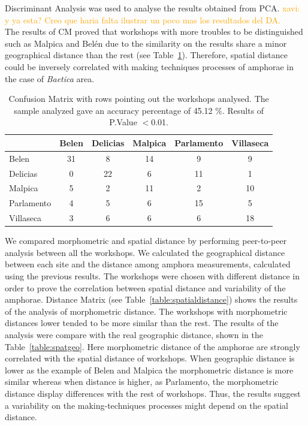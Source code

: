 \documentclass[review]{elsarticle}
\newcommand{\memo}[2]{\textcolor{#1}{#2}}
\newcommand{\xavi}[1]{\memo{orange}{xavi: #1\\}}
\begin{document}
Discriminant Analysis was used to analyse the results obtained from PCA. \xavi{y ya esta? Creo que haria falta ilustrar un poco mas los resultados del DA.} The results of CM proved that workshops with more troubles to be distinguished such as Malpica and Bel\'en due to the similarity on the results share a minor geographical distance than the rest (see Table~\ref{table:confusion}). Therefore, spatial distance could be inversely correlated with making techniques processes of amphorae in the case of \textit{Baetica} area. 


\begin{table}[htp]
\begin{tabular}{lccccc}
\hline
 & Belen & Delicias & Malpica & Parlamento & Villaseca\\ \hline
Belen & 31 &       8 &      14 &          9 &          9 \\
Delicias       & 0 &        22 &       6&         11&         1 \\
Malpica &       5  &     2  &    11   &       2  &      10 \\
Parlamento &     4  &      5 &      6 &        15 &        5\\
Villaseca   &   3   &     6   &    6  &        6  &     18 \\
\hline

\end{tabular}
\caption{Confusion Matrix with rows pointing out the workshops analysed. The sample analyzed gave an accuracy percentage of 45.12 $\%$. Results of P.Value $<$0.01. }
\label{table:confusion}
\end{table}


We compared morphometric and spatial distance by performing peer-to-peer analysis between all the workshops. We calculated the geographical distance between each site and the distance among amphora measurements, calculated using the previous results. The workshops were chosen with different distance in order to prove the correlation between spatial distance and variability of the amphorae. Distance Matrix (see Table~\ref{table:spatialdistance}) shows the results of the analysis of morphometric distance. The workshops with morphometric distances lower tended to be more similar than the rest. The results of the analysis were compare with the real geographic distance, shown in the Table~\ref{table:spatgeo}. Here morphometric distance of the amphorae are strongly correlated with the spatial distance of workshops. When geographic distance is lower as the example of Belen and Malpica the morphometric distance is more similar whereas when distance is higher, as Parlamento, the morphometric distance display differences with the rest of workshops. Thus, the results suggest a variability on the making-techniques processes might depend on the spatial distance.  
\end{document}
